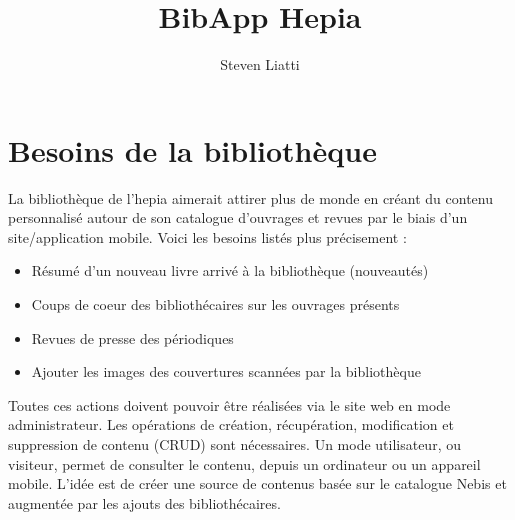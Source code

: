 \documentclass[a4paper, 12pt]{article}
\begin{document}
\title{BibApp Hepia} 
\author{Steven Liatti} 
\maketitle


\section{Besoins de la bibliothèque}
La bibliothèque de l'hepia aimerait attirer plus de monde en créant du contenu personnalisé autour de son 
catalogue d'ouvrages et revues par le biais d'un site/application mobile. Voici les besoins listés plus 
précisement :
\begin{itemize}
	\item Résumé d'un nouveau livre arrivé à la bibliothèque (nouveautés)
	\item Coups de coeur des bibliothécaires sur les ouvrages présents
	\item Revues de presse des périodiques
	\item Ajouter les images des couvertures scannées par la bibliothèque
\end{itemize}
Toutes ces actions doivent pouvoir être réalisées via le site web en mode administrateur. Les opérations de 
création, récupération, modification et suppression de contenu (CRUD) sont nécessaires. Un mode utilisateur, ou visiteur, 
permet de consulter le contenu, depuis un ordinateur ou un appareil mobile. L'idée est de créer une source 
de contenus basée sur le catalogue Nebis et augmentée par les ajouts des bibliothécaires.


\end{document}
